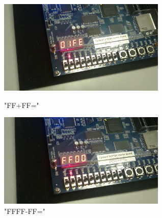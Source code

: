 \documentclass{jsarticle}
\begin{document}
\begin{figure}[htbp]
 \begin{minipage}{0.5\hsize}
  \begin{center}
  \includegraphics[width=8cm,bb=0 0 1920 1080]{FF+FF.png}
  \end{center}
  \caption{"FF+FF="}
 \end{minipage}
 \begin{minipage}{0.5\hsize}
  \begin{center}
   \includegraphics[width=8cm,bb=0 0 1920 1080]{FFFF-FF.png}
  \end{center}
  \caption{"FFFF-FF="}
 \end{minipage}
\end{figure}
\end{document}
